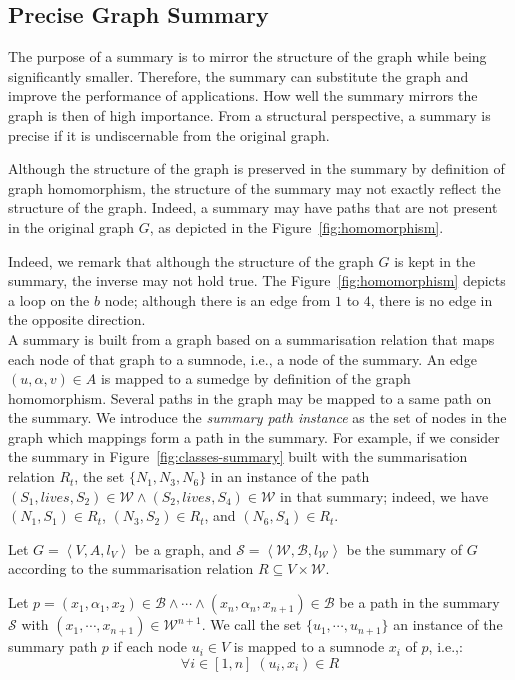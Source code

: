 \subsection{Precise Graph Summary}

The purpose of a summary is to mirror the structure of the graph while being significantly smaller. Therefore, the summary can substitute the graph and improve the performance of applications. How well the summary mirrors the graph is then of high importance. From a structural perspective, a summary is precise if it is undiscernable from the original graph.

Although the structure of the graph is preserved in the summary by definition of graph homomorphism, the structure of the summary may not exactly reflect the structure of the graph. Indeed, a summary may have paths that are not present in the original graph $G$, as depicted in the Figure~\ref{fig:homomorphism}.

Indeed, we remark that although the structure of the graph $G$ is kept in the summary, the inverse may not hold true. The Figure~\ref{fig:homomorphism} depicts a loop on the $b$ node; although there is an edge from $1$ to $4$, there is no edge in the opposite direction.\\

A summary is built from a graph based on a summarisation relation that maps each node of that graph to a sumnode, i.e., a node of the summary. An edge $(u, \alpha, v) \in A$ is mapped to a sumedge by definition of the graph homomorphism. Several paths in the graph may be mapped to a same path on the summary. We introduce the \emph{summary path instance} as the set of nodes in the graph which mappings form a path in the summary. For example, if we consider the summary in Figure~\ref{fig:classes-summary} built with the summarisation relation $R_t$, the set $\{N_1, N_3, N_6\}$ in an instance of the path $(S_1, lives, S_2) \in \mathcal{W} \wedge (S_2, lives, S_4) \in \mathcal{W}$ in that summary; indeed, we have $(N_1, S_1) \in R_t$, $(N_3, S_2) \in R_t$, and $(N_6, S_4) \in R_t$.

\begin{definition}
Let $G=\left\langle V, A, l_V \right\rangle$ be a graph, and $\mathcal{S} = \left\langle \mathcal{W}, \mathcal{B}, l_{\mathcal{W}} \right\rangle$ be the summary of $G$ according to the summarisation relation $R \subseteq V \times \mathcal{W}$.

Let $p = (x_1, \alpha_1, x_2) \in \mathcal{B} \wedge \cdots \wedge (x_n, \alpha_n, x_{n+1}) \in \mathcal{B}$ be a path in the summary $\mathcal{S}$ with $(x_1, \cdots, x_{n+1}) \in \mathcal{W}^{n+1}$.
We call the set $\{ u_1, \cdots, u_{n+1} \}$ an instance of the summary path $p$ if each node $u_i \in V$ is mapped to a sumnode $x_i$ of $p$, i.e.,:
$$
\forall i \in \left[1, n\right] \; (u_i, x_i) \in R
$$
\end{definition}

